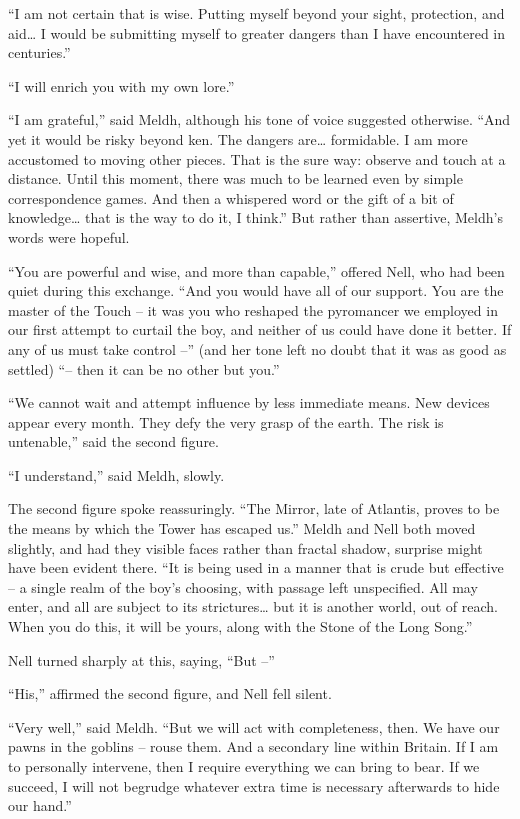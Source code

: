 ``I am not certain that is wise. Putting myself beyond your sight,
protection, and aid\ldots{} I would be submitting myself to greater
dangers than I have encountered in centuries.''

``I will enrich you with my own lore.''

``I am grateful,'' said Meldh, although his tone of voice suggested
otherwise. ``And yet it would be risky beyond ken. The dangers
are\ldots{} formidable. I am more accustomed to moving other pieces.
That is the sure way: observe and touch at a distance. Until this
moment, there was much to be learned even by simple correspondence
games. And then a whispered word or the gift of a bit of
knowledge\ldots{} that is the way to do it, I think.'' But rather than
assertive, Meldh's words were hopeful.

``You are powerful and wise, and more than capable,'' offered Nell, who
had been quiet during this exchange. ``And you would have all of our
support. You are the master of the Touch -- it was you who reshaped the
pyromancer we employed in our first attempt to curtail the boy, and
neither of us could have done it better. If any of us must take control
--'' (and her tone left no doubt that it was as good as settled) ``--
then it can be no other but you.''

``We cannot wait and attempt influence by less immediate means. New
devices appear every month. They defy the very grasp of the earth. The
risk is untenable,'' said the second figure.

``I understand,'' said Meldh, slowly.

The second figure spoke reassuringly. ``The Mirror, late of Atlantis,
proves to be the means by which the Tower has escaped us.'' Meldh and
Nell both moved slightly, and had they visible faces rather than fractal
shadow, surprise might have been evident there. ``It is being used in a
manner that is crude but effective -- a single realm of the boy's
choosing, with passage left unspecified. All may enter, and all are
subject to its strictures\ldots{} but it is another world, out of reach.
When you do this, it will be yours, along with the Stone of the Long
Song.''

Nell turned sharply at this, saying, ``But --''

``His,'' affirmed the second figure, and Nell fell silent.

``Very well,'' said Meldh. ``But we will act with completeness, then. We
have our pawns in the goblins -- rouse them. And a secondary line within
Britain. If I am to personally intervene, then I require everything we
can bring to bear. If we succeed, I will not begrudge whatever extra
time is necessary afterwards to hide our hand.''

